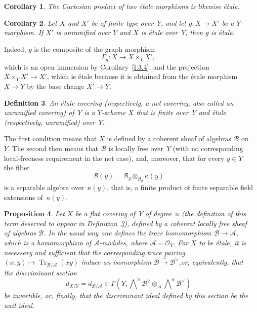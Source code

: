 \documentclass[11pt,oneside]{amsbook}
\newtheorem{proposition}{Proposition}[section]
\newtheorem{corollary}[proposition]{Corollary}
\newtheorem{definition}[proposition]{Definition}
\theoremstyle{remark}
\theoremstyle{plain}
\numberwithin{equation}{section}
\begin{document}
\begin{corollary}
\label{I.4.7}
The Cartesian product of two étale morphisms is likewise étale.
\end{corollary}

\begin{corollary}
\label{I.4.8}
Let \(X\) and \(X'\) be of finite type over~\(Y\), and let
\(g\colon X\to X'\) be a \(Y\)-morphism.  If \(X'\) is unramified over
\(Y\) and \(X\) is étale over~\(Y\), then \(g\) is étale.
\end{corollary}

Indeed, \(g\) is the composite of the graph morphism
\[
  \Gamma_g\colon X\longrightarrow X\times_Y X',
\]
which is an open immersion by Corollary~\ref{I.3.4}, and the projection
\(X\times_Y X'\to X'\), which is étale because it is obtained from the
étale morphism \(X\to Y\) by the base change \(X'\to Y\).

\begin{definition}
\label{I.4.9}
An \emph{étale covering} (respectively, a \emph{net covering}, also called
an unramified covering) of~\(Y\) is a \(Y\)-scheme \(X\) that is finite
over~\(Y\) and étale (respectively, unramified) over~\(Y\).
\end{definition}

The first condition means that \(X\) is defined by a coherent sheaf of
algebras \(\mathcal B\) on~\(Y\).  The second then means that \(\mathcal B\)
is locally free over~\(Y\) (with no corresponding local-freeness requirement
in the net case), and, moreover, that for every \(y\in Y\) the fiber
\[
  \mathcal B(y)=\mathcal B_y\otimes_{\mathcal O_y}\kappa(y)
\]
is a separable algebra over~\(\kappa(y)\), that is, a finite product of
finite separable field extensions of~\(\kappa(y)\).

\begin{proposition}
\label{I.4.10}
Let \(X\) be a flat covering of~\(Y\) of degree~\(n\) (the definition of
this term deserved to appear in Definition~\ref{I.4.9}), defined by a
coherent locally free sheaf of algebras \(\mathcal B\).  In the usual way one
defines the trace homomorphism \(\mathcal B\to\mathcal A\), which is a
homomorphism of \(\mathcal A\)-modules, where
\(\mathcal A=\mathcal O_Y\).  For \(X\) to be étale, it is necessary and
sufficient that the corresponding trace pairing
\((x,y)\longmapsto\operatorname{Tr}_{\mathcal B/\mathcal A}(xy)\) induce an
isomorphism \(\mathcal B\xrightarrow{\sim}\mathcal B^\vee\),or,
equivalently,
that the \emph{discriminant section}
\[
  d_{X/Y}=d_{\mathcal B/\mathcal A}
  \in
  \Gamma\!\left(
    Y,
    \bigwedge\nolimits^n\mathcal B^\vee
    \otimes_{\mathcal A}
    \bigwedge\nolimits^n\mathcal B^\vee
  \right)
\]
be invertible, or, finally, that the discriminant ideal defined by this
section be the unit ideal.
\end{proposition}
\end{document}
